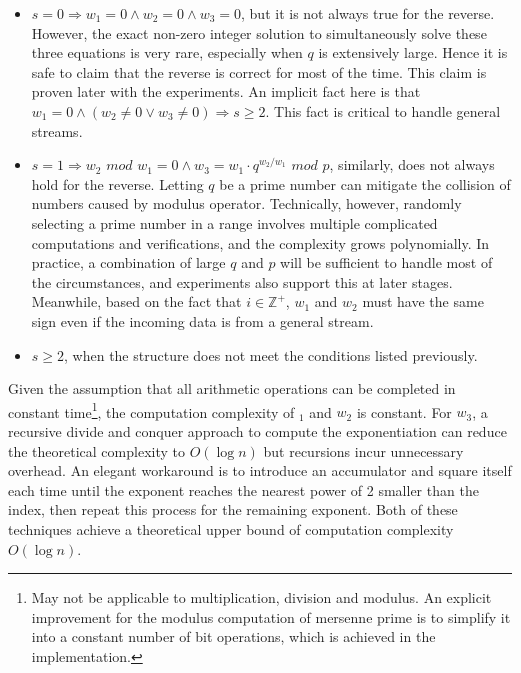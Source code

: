 \documentclass[a4paper, 11pt]{article}
\begin{document}
                \begin{itemize}
                    \item $s = 0 \Rightarrow w_{1} = 0 \wedge w_{2} = 0 \wedge w_{3} = 0$, but it is not always true for the reverse. However, the exact non-zero integer solution to simultaneously solve these three equations is very rare, especially when $q$ is extensively large. Hence it is safe to claim that the reverse is correct for most of the time. This claim is proven later with the experiments. An implicit fact here is that $w_{1} = 0 \wedge \left( w_{2} \neq 0 \vee w_{3} \neq 0 \right) \Rightarrow s \geq 2$. This fact is critical to handle general streams.
                    \item $s = 1 \Rightarrow w_{2} \textit{ mod } w_{1} = 0 \wedge w_{3} = w_{1} \cdot q^{w_{2} / w_{1}} \textit{ mod } p$, similarly, does not always hold for the reverse. Letting $q$ be a prime number can mitigate the collision of numbers caused by modulus operator. Technically, however, randomly selecting a prime number in a range involves multiple complicated computations and verifications, and the complexity grows polynomially. In practice, a combination of large $q$ and $p$ will be sufficient to handle most of the circumstances, and experiments also support this at later stages. Meanwhile, based on the fact that $i \in \mathbb{Z}^{+}$, $w_{1}$ and $w_{2}$ must have the same sign even if the incoming data is from a general stream.
                    \item $s \geq 2$, when the structure does not meet the conditions listed previously.
                \end{itemize}
                Given the assumption that all arithmetic operations can be completed in constant time\footnote{May not be applicable to multiplication, division and modulus. An explicit improvement for the modulus computation of mersenne prime is to simplify it into a constant number of bit operations, which is achieved in the implementation.}, the computation complexity of $_{1}$ and $w_{2}$ is constant. For $w_{3}$, a recursive divide and conquer approach to compute the exponentiation can reduce the theoretical complexity to $O \left( \log{n} \right)$ but recursions incur unnecessary overhead. An elegant workaround is to introduce an accumulator and square itself each time until the exponent reaches the nearest power of 2 smaller than the index, then repeat this process for the remaining exponent. Both of these techniques achieve a theoretical upper bound of computation complexity $O \left( \log{n} \right)$.
\end{document}
